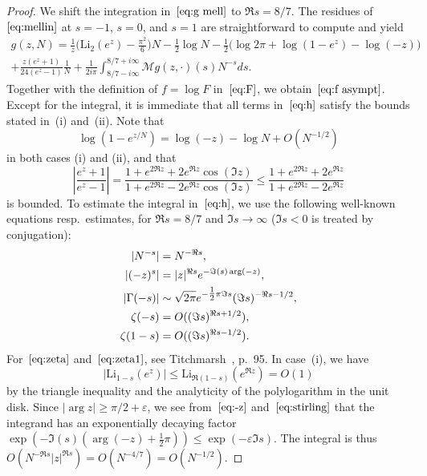 \documentclass[a4paper]{amsart}
\begin{document}
\begin{proof}
    We shift the integration in~$\ref{eq:g mell}$ to $\Re s=8/7$.
   The residues of~$\ref{eq:mellin}$ at $s=-1$, $s=0$, and $s=1$ are straightforward
   to compute and yield
  \begin{multline*}
         g(z,N) = \frac{1}{z}\Big( \mathrm{Li}_2(e^z) - \frac{\pi^2}{6}\Big)N
   - \frac12 \log N 
    - \frac12 \Big(\log 2\pi    +\log(1-e^{z})  - \log(-z)\Big)\\
         + \frac{z(e^z+1)}{24(e^z-1)} \frac1N
         +\frac{1}{2i\pi}\int_{8/7-i\infty}^{8/7+i\infty}  \mathcal{M}g(z,\cdot)(s) N^{-s} ds.
  \end{multline*}
   Together with the definition of $f=\log F$ in~$\ref{eq:F}$, we obtain~$\ref{eq:f asympt}$.
   Except for the integral, it is immediate that all terms in~$\ref{eq:h}$ satisfy
   the bounds stated in~(i) and~(ii). Note  that
   \[
     \log(1-e^{z/N}) = \log(-z) - \log N + O(N^{-1/2})
   \]
   in both cases (i) and (ii), and that
   \[
    \left |\frac{e^z+1}{e^z-1}\right| 
      = \frac{1+e^{2 \Re z} +2e^{ \Re z} \cos(\Im z)}
        {1+e^{2 \Re z} -2e^{ \Re z} \cos(\Im z)}
      \leq \frac{1+e^{2 \Re z} +2e^{ \Re z} }
        {1+e^{2 \Re z} -2e^{ \Re z} }
  \]
  is bounded. To estimate the integral in~$\ref{eq:h}$, we use
  the following well-known equations resp.\ estimates, for $\Re s= 8/7$ and
  $\Im s\to \infty$ ($\Im s<0$ is treated by conjugation):
  \begin{align}
    |N^{-s}| &= N^{-\Re s}, \notag \\
    |(-z)^s| &= |z|^{\Re s} e^{-\Im(s) \arg(-z)}, \label{eq:-z} \\
    |\Gamma(-s)| &\sim \sqrt{2\pi} e^{-\tfrac12\pi \Im s} (\Im s)^{-\Re s - 1/2},  \label{eq:stirling}  \\
    \zeta(-s) &= O((\Im s)^{\Re s+1/2}),  \label{eq:zeta} \\
    \zeta(1-s)&= O((\Im s)^{ \Re s-1/2}).   \label{eq:zeta1}
  \end{align}
  For~$\ref{eq:zeta}$ and~$\ref{eq:zeta1}$, see Titchmarsh~\cite{Ti86}, p.~95.
  In case~(i), we have
  \[
    |\mathrm{Li}_{1-s}(e^z) | \leq \mathrm{Li}_{\Re(1-s)}(e^{\Re z}) = O(1)
  \]
  by the triangle inequality and the analyticity of the polylogarithm
  in the unit disk.
  Since $|\arg z|\geq \pi/2+\varepsilon$, we see from~$\ref{eq:-z}$
  and~$\ref{eq:stirling}$ that the integrand has an exponentially decaying factor
  $\exp(-\Im(s) (\arg(-z) + \tfrac12 \pi )) \leq \exp(-\varepsilon\Im s)$.
  The integral is thus $O(N^{-\Re s}|z|^{\Re s})=O(N^{-4/7})=O(N^{-1/2})$.
  

\end{proof}
\end{document}
